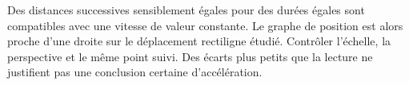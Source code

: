 \par\noindent\begin{minipage}{\linewidth}
\label{cor-activite-9}
Des distances successives sensiblement égales pour des durées égales sont compatibles avec une vitesse de valeur constante. Le graphe de position est alors proche d’une droite sur le déplacement rectiligne étudié. Contrôler l’échelle, la perspective et le même point suivi. Des écarts plus petits que la lecture ne justifient pas une conclusion certaine d’accélération.\par\end{minipage}
